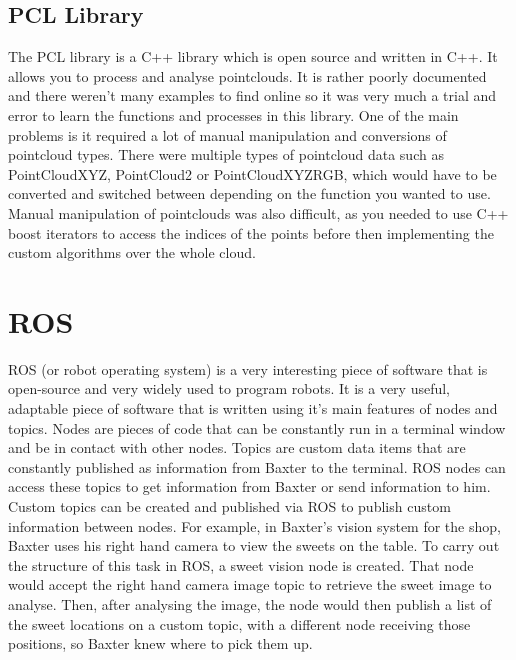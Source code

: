 \subsection{PCL Library}
The PCL library is a C++ library which is open source and written in C++. It allows you to process and analyse pointclouds. It is rather poorly documented and there weren't many examples to find online so it was very much a trial and error to learn the functions and processes in this library. One of the main problems is it required a lot of manual manipulation and conversions of pointcloud types. There were multiple types of pointcloud data such as PointCloudXYZ, PointCloud2 or PointCloudXYZRGB, which would have to be converted and switched between depending on the function you wanted to use. Manual manipulation of pointclouds was also difficult, as you needed to use C++ boost iterators to access the indices of the points before then implementing the custom algorithms over the whole cloud.
\section{ROS}
ROS (or robot operating system) is a very interesting piece of software that is open-source and very widely used to program robots. It is a very useful, adaptable piece of software that is written using it's main features of nodes and topics. Nodes are pieces of code that can be constantly run in a terminal window and be in contact with other nodes. Topics are custom data items that are constantly published as information from Baxter to the terminal. ROS nodes can access these topics to get information from Baxter or send information to him. Custom topics can be created and published via ROS to publish custom information between nodes.
\newline\newline
For example, in Baxter's vision system for the shop, Baxter uses his right hand camera to view the sweets on the table. To carry out the structure of this task in ROS, a sweet vision node is created. That node would accept the right hand camera image topic to retrieve the sweet image to analyse. Then, after analysing the image, the node would then publish a list of the sweet locations on a custom topic, with a different node receiving those positions, so Baxter knew where to pick them up.
